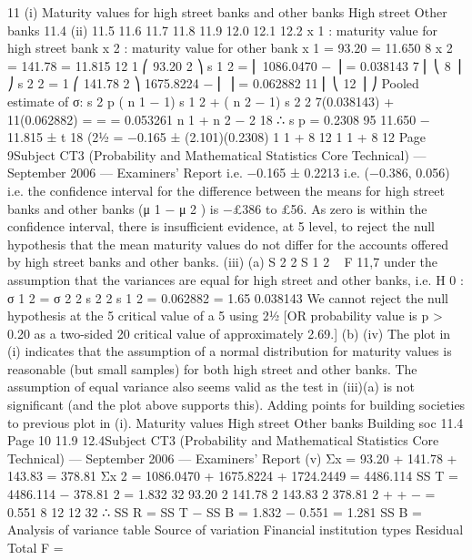 \documentclass[a4paper,12pt]{article}
\begin{document}
\begin{enumerate}
11
(i)
Maturity values for high street banks and other banks
High street
Other banks
11.4
(ii)
11.5
11.6
11.7
11.8
11.9
12.0
12.1
12.2
x 1 : maturity value for high street bank
x 2 : maturity value for other bank
x 1 = 93.20
= 11.650
8
x 2 = 141.78
= 11.815
12
1 ⎛
93.20 2 ⎞
s 1 2 = ⎜ 1086.0470 −
⎟ = 0.038143
7 ⎜ ⎝
8 ⎟ ⎠
s 2 2 =
1 ⎛
141.78 2 ⎞
1675.8224
−
⎜
⎟ = 0.062882
11 ⎜ ⎝
12 ⎟ ⎠
Pooled estimate of σ:
s 2 p
( n 1 − 1) s 1 2 + ( n 2 − 1) s 2 2 7(0.038143) + 11(0.062882)
=
=
= 0.053261
n 1 + n 2 − 2
18
∴ s p = 0.2308
95%
11.650 − 11.815 ± t 18 (21⁄2%
= −0.165 ± (2.101)(0.2308)
1 1
+
8 12
1 1
+
8 12
Page 9Subject CT3 (Probability and Mathematical Statistics Core Technical) — September 2006 — Examiners’ Report
i.e. −0.165 ± 0.2213
i.e. (−0.386, 0.056)
i.e. the confidence interval for the difference between the means for high street
banks and other banks (μ 1 − μ 2 ) is −£386 to £56.
As zero is within the confidence interval, there is insufficient evidence, at 5%
level, to reject the null hypothesis that the mean maturity values do not differ
for the accounts offered by high street banks and other banks.
(iii)
(a)
S 2 2
S 1 2
~ F 11,7
under the assumption that the variances are equal for high street and
other banks,
i.e. H 0 : σ 1 2 = σ 2 2
s 2 2
s 1 2
=
0.062882
= 1.65
0.038143
We cannot reject the null hypothesis at the 5%
critical value of a 5%
using 21⁄2%
[OR probability value is p > 0.20 as a two-sided 20%
critical value of approximately 2.69.]
(b)
(iv)
The plot in (i) indicates that the assumption of a normal distribution for
maturity values is reasonable (but small samples) for both high street
and other banks. The assumption of equal variance also seems valid as
the test in (iii)(a) is not significant (and the plot above supports this).
Adding points for building societies to previous plot in (i).
Maturity values
High street
Other banks
Building soc
11.4
Page 10
11.9
12.4Subject CT3 (Probability and Mathematical Statistics Core Technical) — September 2006 — Examiners’ Report
(v)
Σx = 93.20 + 141.78 + 143.83 = 378.81
Σx 2 = 1086.0470 + 1675.8224 + 1724.2449 = 4486.114
SS T = 4486.114 −
378.81 2
= 1.832
32
93.20 2 141.78 2 143.83 2 378.81 2
+
+
−
= 0.551
8
12
12
32
∴ SS R = SS T − SS B = 1.832 − 0.551 = 1.281
SS B =
Analysis of variance table
Source of variation
Financial institution types
Residual
Total
F =

\end{enumerate}
\end{document}
